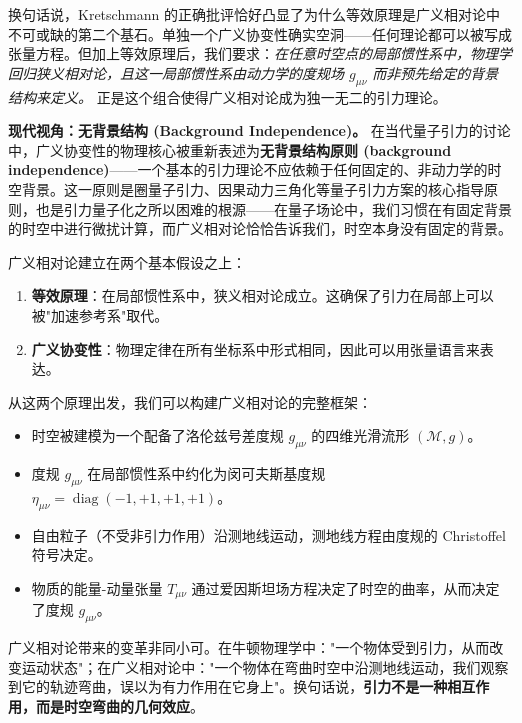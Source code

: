 换句话说，Kretschmann 的正确批评恰好凸显了为什么等效原理是广义相对论中不可或缺的第二个基石。单独一个广义协变性确实空洞——任何理论都可以被写成张量方程。但加上等效原理后，我们要求：\textit{在任意时空点的局部惯性系中，物理学回归狭义相对论，且这一局部惯性系由动力学的度规场 $g_{\mu\nu}$ 而非预先给定的背景结构来定义。} 正是这个组合使得广义相对论成为独一无二的引力理论。

\medskip

\noindent\textbf{现代视角：无背景结构 (Background Independence)。} 在当代量子引力的讨论中，广义协变性的物理核心被重新表述为\textbf{无背景结构原则 (background independence)}——一个基本的引力理论不应依赖于任何固定的、非动力学的时空背景。这一原则是圈量子引力、因果动力三角化等量子引力方案的核心指导原则，也是引力量子化之所以困难的根源——在量子场论中，我们习惯在有固定背景的时空中进行微扰计算，而广义相对论恰恰告诉我们，时空本身没有固定的背景。

广义相对论建立在两个基本假设之上：

\begin{enumerate}
    \item \textbf{等效原理}：在局部惯性系中，狭义相对论成立。这确保了引力在局部上可以被"加速参考系"取代。
    \item \textbf{广义协变性}：物理定律在所有坐标系中形式相同，因此可以用张量语言来表达。
\end{enumerate}

从这两个原理出发，我们可以构建广义相对论的完整框架：

\begin{itemize}
    \item 时空被建模为一个配备了洛伦兹号差度规 $g_{\mu\nu}$ 的四维光滑流形 $(\mathcal{M}, g)$。
    \item 度规 $g_{\mu\nu}$ 在局部惯性系中约化为闵可夫斯基度规 $\eta_{\mu\nu} = \operatorname{diag}(-1,+1,+1,+1)$。
    \item 自由粒子（不受非引力作用）沿测地线运动，测地线方程由度规的 Christoffel 符号决定。
    \item 物质的能量-动量张量 $T_{\mu\nu}$ 通过爱因斯坦场方程决定了时空的曲率，从而决定了度规 $g_{\mu\nu}$。
\end{itemize}

\begin{note}
广义相对论带来的变革非同小可。在牛顿物理学中："一个物体受到引力，从而改变运动状态"；在广义相对论中："一个物体在弯曲时空中沿测地线运动，我们观察到它的轨迹弯曲，误以为有力作用在它身上"。换句话说，\textbf{引力不是一种相互作用，而是时空弯曲的几何效应}。
\end{note}

